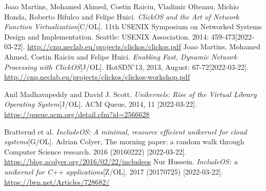 \documentclass[UTF8,fontset=none,linespread=1.15]{ctexart}
\begin{document}
\begin{thebibliography}{99}
 Joao Martins, Mohamed Ahmed, Costin Raiciu, Vladimir Olteanu,
Michio Honda, Roberto Bifulco and Felipe Huici. \textit{ClickOS and the Art of Network Function Virtualization}[C/OL]. 11th USENIX Symposium on Networked Systems
Design and Implementation. Seattle: USENIX Association. 2014: 459-473[2022-03-22]. \url{http://cnp.neclab.eu/projects/clickos/clickos.pdf}
 Joao Martins, Mohamed Ahmed, Costin Raiciu and Felipe Huici.
\textit{Enabling Fast, Dynamic Network Processing with ClickOS}[J/OL]. HotSDN'13, 2013, August: 67-72[2022-03-22]. \url{http://cnp.neclab.eu/projects/clickos/clickos-workshop.pdf}

 Anil Madhavapeddy and David J. Scott. \textit{Unikernels: Rise of the Virtual Library Operating System}[J/OL]. ACM Queue, 2014, 11 [2022-03-22].  \url{https://queue.acm.org/detail.cfm?id=2566628}

  Bratterud et al. \textit{IncludeOS: A minimal, resource efficient unikernel for cloud systems}[G/OL]. Adrian Colyer, The morning paper: a random walk through Computer Science research. 2016 (20160222) [2022-03-22]. \url{https://blog.acolyer.org/2016/02/22/includeos}
 Nur Hussein. \textit{IncludeOS: a unikernel for C++ applications}[Z/OL]. 2017 (20170725) [2022-03-22]. \url{https://lwn.net/Articles/728682/}


\end{thebibliography}
\end{document}

